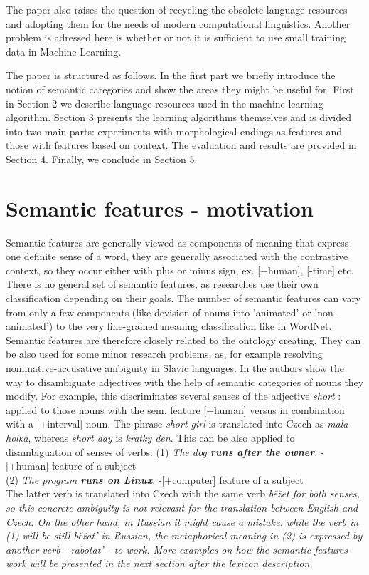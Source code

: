 \documentclass[letterpaper]{article}
\begin{document}
The paper also raises the question of recycling the obsolete language resources and adopting them for the
needs of modern computational linguistics. Another problem is adressed here is whether or not it is 
sufficient to use small  training data in Machine Learning.

The paper is structured as follows. In the first part
we briefly introduce the notion of semantic categories and
show the areas they might be useful for. 
First in Section 2 we describe 
language resources used in the machine learning algorithm. Section 3 
presents the learning algorithms themselves and is divided into two main
parts: experiments with morphological endings as features
and those with features based on context. The evaluation and results are
provided in Section 4. Finally, we conclude in Section 5.

\section{Semantic features - motivation}
Semantic features are generally viewed as components of meaning
that express one definite sense of a word, they are generally associated
with the contrastive context, so they occur either with plus or minus
sign, ex. [+human], [-time] etc.
There is no general set of semantic features, as researches
use their own classification depending on their goals. The
number of semantic features can vary from only a few components (like
devision of nouns into 'animated' or 'non-animated') to the very
fine-grained meaning classification like in WordNet. Semantic features
are therefore closely related to the ontology creating.
They can be also used for some minor research problems, as, for example
resolving nominative-accusative ambiguity in Slavic languages.
In \cite{principled_disam} the authors show the way to disambiguate adjectives
with the help of semantic categories of nouns they modify. For example, 
this discriminates several senses of the  adjective \textit{short}
: applied to those nouns with the sem. feature [+human] versus in combination
with a [+interval] noun. The phrase \textit{short girl} is translated
into Czech as \textit{mala holka}, whereas \textit{short day} is \textit{kratky den}.
This can be also applied to disambiguation of senses of verbs: 
(1) \textit{The dog \bf{runs} after the owner}. - [+human] feature of a subject\\
(2) \textit{The program \bf{runs} on Linux}. -[+computer] feature of a subject \\
The latter verb is translated into Czech with the same verb \it{běžet}
for both senses, so this concrete ambiguity is not relevant for
the translation between English and Czech. On the other hand, in Russian
it might cause a mistake: while the verb in (1) will be still \it{běžat'} in Russian,
the metaphorical meaning in (2) is expressed by another verb - \it{rabotat'} - to work.
More examples on how the semantic features work will be presented in the next section
after the lexicon description.
\end{document}
